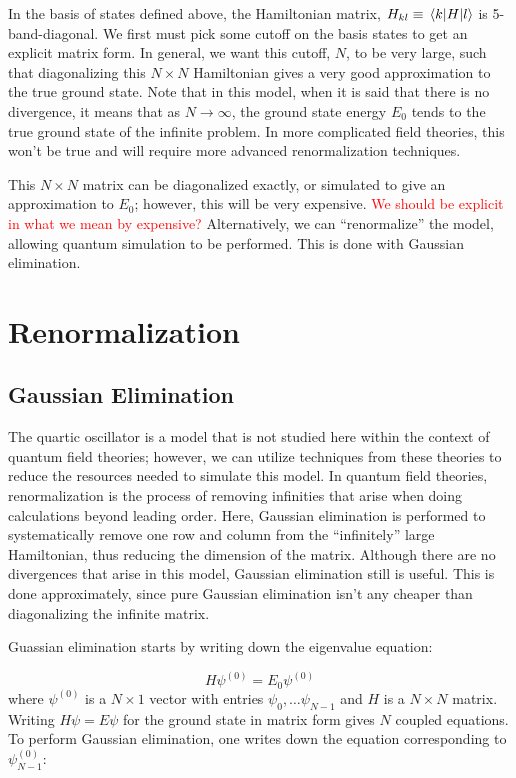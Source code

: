 \documentclass[%
 reprint,
nofootinbib,
 amsmath,amssymb,
 aps,
]{revtex4-2}
\numberwithin{equation}{section}
\begin{document}
In the basis of states defined above, the Hamiltonian matrix, 
$H_{kl} \equiv\matrixel{k}{H}{l}$ is 5-band-diagonal. We first must pick some cutoff
on the basis states to get an explicit matrix form. In general, we want this cutoff, $N$,
to be very large, such that diagonalizing this $N \times N$ Hamiltonian gives a very good 
approximation to the true ground state. Note that in this model, when it is said that
there is no divergence, it means that as $N \rightarrow \infty$, the ground state energy
$E_0$ tends to the true ground state of the infinite problem. In more complicated field
theories, this won't be true and will require more advanced renormalization techniques.

This $N \times N$ matrix can be diagonalized exactly, or simulated to give an approximation to
$E_0$; however, this will be very expensive. \textcolor{red}{We should be explicit in 
what we mean by expensive?} Alternatively, we can ``renormalize'' the model, allowing quantum
simulation to be performed. This is done with Gaussian elimination.

\section{Renormalization}
\subsection{Gaussian Elimination}
The quartic oscillator is a model that is not studied here within the context
of quantum field theories; however, we can utilize techniques from these 
theories to reduce the resources needed to simulate this model. 
In quantum field theories, renormalization is the process of removing infinities
that arise when doing calculations beyond leading order. Here, Gaussian elimination 
is performed to systematically remove one row and column from the ``infinitely''
large Hamiltonian, thus reducing the dimension of the matrix. Although there are no 
divergences that arise in this model, Gaussian elimination still is useful. This is done
approximately, since pure Gaussian elimination isn't any cheaper than 
diagonalizing the infinite matrix. 

Guassian elimination starts by writing down the eigenvalue equation: 

\begin{equation}
  H\psi^{(0)} = E_0 \psi^{(0)}
\end{equation}
where $\psi^{(0)}$ is a $N \times 1$ vector with entries $\psi_0, \dots \psi_{N - 1}$ and $H$
is a $N \times N$ matrix. Writing $H\psi = E\psi$ for the ground state in matrix form gives 
$N$ coupled equations. To perform Gaussian elimination, one writes down the equation
corresponding to $\psi^{(0)}_{N - 1}$:
\end{document}
